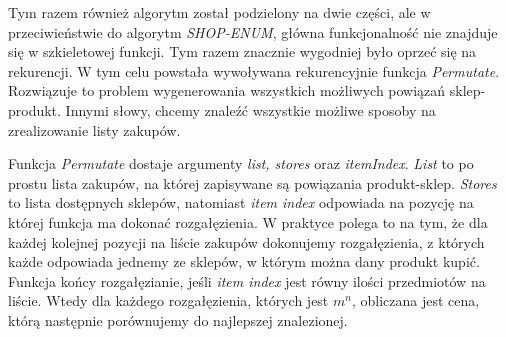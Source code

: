 \documentclass[a4paper]{article}
\begin{document}
Tym razem również algorytm został podzielony na dwie części, ale w przeciwieństwie do algorytm \textit{SHOP-ENUM}, główna funkcjonalność nie znajduje się w szkieletowej funkcji. Tym razem znacznie wygodniej było oprzeć się na rekurencji. W tym celu powstała wywoływana rekurencyjnie funkcja \textit{Permutate}. Rozwiązuje to problem wygenerowania wszystkich możliwych powiązań sklep-produkt. Innymi słowy, chcemy znaleźć wszystkie możliwe sposoby na zrealizowanie listy zakupów.

Funkcja \textit{Permutate} dostaje argumenty \textit{list, stores} oraz \textit{itemIndex}. \textit{List} to po prostu lista zakupów, na której zapisywane są powiązania produkt-sklep. \textit{Stores} to lista dostępnych sklepów, natomiast \textit{item index} odpowiada na pozycję na której funkcja ma dokonać rozgałęzienia. W praktyce polega to na tym, że dla każdej kolejnej pozycji na liście zakupów dokonujemy rozgałęzienia, z których każde odpowiada jednemy ze sklepów, w którym można dany produkt kupić. Funkcja końcy rozgałęzianie, jeśli \textit{item index} jest równy ilości przedmiotów na liście. Wtedy dla każdego rozgałęzienia, których jest $m^n$, obliczana jest cena, którą następnie porównujemy do najlepszej znalezionej.
\newpage
\end{document}
